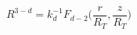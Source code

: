 \begin{equation}
\label{Rdef}
R^{3-d}
= k_d^{-1} F_{d-2} \Big( \frac{r}{R_T} , \frac{z}{R_T} \Big)
 \end{equation}

